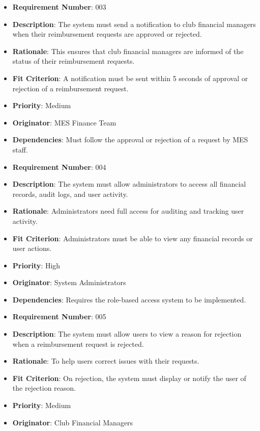 \documentclass[12pt]{article}
\begin{document}
\begin{itemize}
  \item \textbf{Requirement Number}: 003
  \item \textbf{Description}: The system must send a notification to club financial managers when their reimbursement requests are approved or rejected.
  \item \textbf{Rationale}: This ensures that club financial managers are informed of the status of their reimbursement requests.
  \item \textbf{Fit Criterion}: A notification must be sent within 5 seconds of approval or rejection of a reimbursement request.
  \item \textbf{Priority}: Medium
  \item \textbf{Originator}: MES Finance Team
  \item \textbf{Dependencies}: Must follow the approval or rejection of a request by MES staff.

  \bigskip

  \item \textbf{Requirement Number}: 004
  \item \textbf{Description}: The system must allow administrators to access all financial records, audit logs, and user activity.
  \item \textbf{Rationale}: Administrators need full access for auditing and tracking user activity.
  \item \textbf{Fit Criterion}: Administrators must be able to view any financial records or user actions.
  \item \textbf{Priority}: High
  \item \textbf{Originator}: System Administrators
  \item \textbf{Dependencies}: Requires the role-based access system to be implemented.
  
  \bigskip
  
  \item \textbf{Requirement Number}: 005
  \item \textbf{Description}: The system must allow users to view a reason for rejection when a reimbursement request is rejected.
  \item \textbf{Rationale}: To help users correct issues with their requests.
  \item \textbf{Fit Criterion}: On rejection, the system must display or notify the user of the rejection reason.
  \item \textbf{Priority}: Medium
  \item \textbf{Originator}: Club Financial Managers

\end{itemize}
\end{document}
